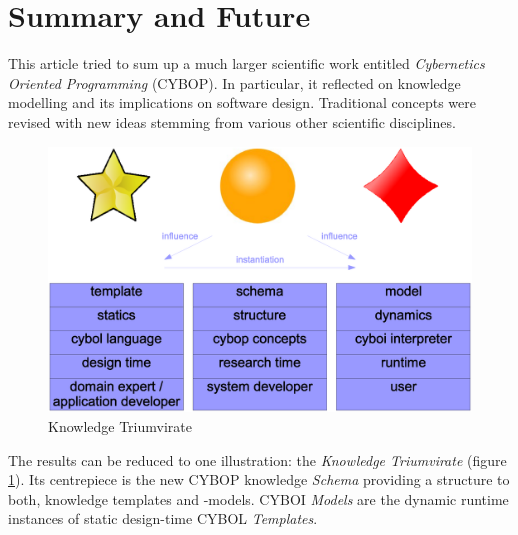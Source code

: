 %
%
%
%
%
%
%

\section{Summary and Future}
\label{summary_heading}

This article tried to sum up a much larger scientific work entitled
\emph{Cybernetics Oriented Programming} (CYBOP). In particular, it reflected on
knowledge modelling and its implications on software design. Traditional
concepts were revised with new ideas stemming from various other scientific
disciplines.

\begin{figure}[ht]
    \begin{center}
        \includegraphics[scale=0.2]{vector/triumvirate.eps}
        \caption{Knowledge Triumvirate}
        \label{triumvirate_figure}
    \end{center}
\end{figure}

The results can be reduced to one illustration: the \emph{Knowledge Triumvirate}
(figure \ref{triumvirate_figure}). Its centrepiece is the new CYBOP knowledge
\emph{Schema} providing a structure to both, knowledge templates and -models.
CYBOI \emph{Models} are the dynamic runtime instances of static design-time
CYBOL \emph{Templates}.

